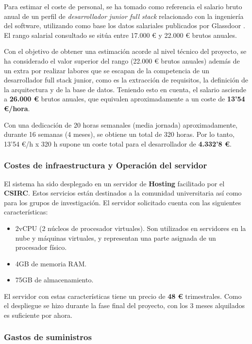 Para estimar el coste de personal, se ha tomado como referencia el salario bruto anual de un perfil de \textit{desarrollador junior full stack} relacionado 
con la ingeniería del software, utilizando como base los datos salariales publicados por Glassdoor \cite{glassdoor}. El rango salarial consultado se sitúa 
entre 17.000 € y 22.000 € brutos anuales.

Con el objetivo de obtener una estimación acorde al nivel técnico del proyecto, se ha considerado el valor superior del rango (22.000 € brutos anuales) además
de un extra por realizar labores que se escapan de la competencia de un desarrollador full stack junior, como es la extracción de requisitos, la definición de la
arquitectura y de la base de datos. Teniendo esto en cuenta, el salario asciende a \textbf{26.000 €} brutos anuales, que equivalen aproximadamente a un coste de 
\textbf{13'54 €/hora}.

Con una dedicación de 20 horas semanales (media jornada) aproximadamente, durante 16 semanas (4 meses), se obtiene un total de 320 horas. Por lo tanto, 13'54 €/h x 320 h 
supone un coste total para el desarrollador de \textbf{4.332'8 €}.

\subsubsection{Costes de infraestructura y Operación del servidor}

El sistema ha sido desplegado en un servidor de \textbf{Hosting} facilitado por el \textbf{CSIRC}. Estos servicios están destinados a la comunidad universitaria así como para los grupos de investigación.
El servidor solicitado cuenta con las siguientes características:

\begin{itemize}
    \item 2vCPU (2 núcleos de procesador virtuales). Son utilizados en servidores en la nube y máquinas virtuales, y representan una parte asignada de un procesador físico.
    \item 4GB de memoria RAM.
    \item 75GB de almacenamiento.
\end{itemize}

El servidor con estas características tiene un precio de \textbf{48 €} trimestrales. Como el despliegue se hizo durante la fase final del proyecto, con los 3 meses alquilados es suficiente por ahora.

\subsubsection{Gastos de suministros}

